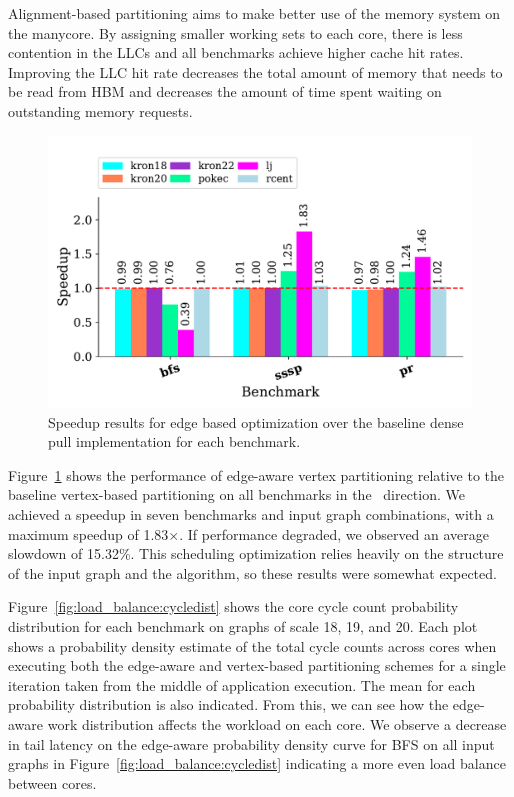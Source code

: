 Alignment-based partitioning aims to make better use of the memory system on the manycore. 
By assigning smaller working sets to each core, there is less contention in the LLCs and all benchmarks achieve higher cache hit rates. 
Improving the LLC hit rate decreases the total amount of memory that needs to be read from HBM and decreases the amount of time spent waiting on outstanding memory requests.
 
 
\begin{figure}[!ht]
    \centering
    \includegraphics[scale = 0.6]{graphit-figures/edge.pdf}
    \caption{Speedup results for edge based optimization over the baseline dense pull implementation for each benchmark.}
    \label{pap:generals:sec:eval:fig:edge}
\end{figure}

\edgeAwareHist
 
Figure~\ref{pap:generals:sec:eval:fig:edge} shows the performance of edge-aware vertex partitioning relative to the baseline vertex-based partitioning on all benchmarks in the \pull~direction. 
We achieved a speedup in seven benchmarks and input graph combinations, with a maximum speedup of 1.83$\times$.
If performance degraded, we observed an average slowdown of 15.32\%. 
This scheduling optimization relies heavily on the structure of the input graph and the algorithm, so these results were somewhat expected.

Figure~\ref{fig:load_balance:cycledist} shows the core cycle count probability distribution for each benchmark on \kron graphs of scale 18, 19, and 20.
Each plot shows a probability density estimate of the total cycle counts across cores when executing both the edge-aware and vertex-based partitioning schemes for a single iteration taken from the middle of application execution.
The mean for each probability distribution is also indicated.
From this, we can see how the edge-aware work distribution affects the workload on each core.
We observe a decrease in tail latency on the edge-aware probability density curve for BFS on all input graphs in Figure~\ref{fig:load_balance:cycledist} indicating a more even load balance between cores. 

